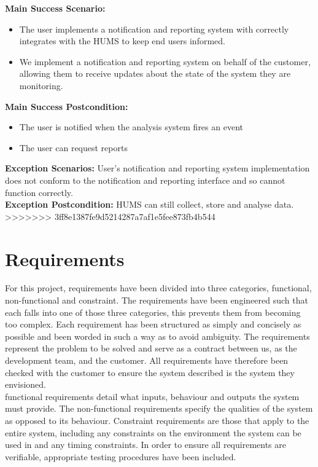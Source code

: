 \documentclass[10pt,a4paper]{article}
\begin{document}
\textbf{Main Success Scenario:}
\begin{itemize}
\item The user implements a notification and reporting system with correctly
integrates with the HUMS to keep end users informed.
\item We implement a notification and reporting system on behalf of the
customer, allowing them to receive updates about the state of the system they
are monitoring.
\end{itemize}
\textbf{Main Success Postcondition:}
\begin{itemize}
\item The user is notified when the analysis system fires an event
\item The user can request reports
\end{itemize}
\textbf{Exception Scenarios:} User's notification and reporting system
implementation does not conform to the notification and reporting interface and
so cannot function correctly.\\
\textbf{Exception Postcondition:} HUMS can still collect, store and analyse
data.
>>>>>>> 3ff8e1387fe9d5214287a7af1e5fee873fb4b544

\section{Requirements}
For this project, requirements have been divided into three categories,
functional, non-functional and constraint. The requirements have been
engineered such that each falls into one of those three categories, this
prevents them from becoming too complex. Each requirement has been
structured as simply and concisely as possible and been worded in such a way
as to avoid ambiguity. The requirements represent the problem to be solved
and serve as a contract between us, as the development team, and the
customer. All requirements have therefore been checked with the customer to
ensure the system described is the system they envisioned.\\
functional requirements detail what inputs, behaviour and outputs the system
must provide. The non-functional requirements specify the qualities of the
system as opposed to its behaviour. Constraint requirements are those that apply
to the entire system, including any constraints on the environment the system
can be used in and any timing constraints. In order to ensure all requirements
are verifiable, appropriate testing procedures have been included.
\end{document}
